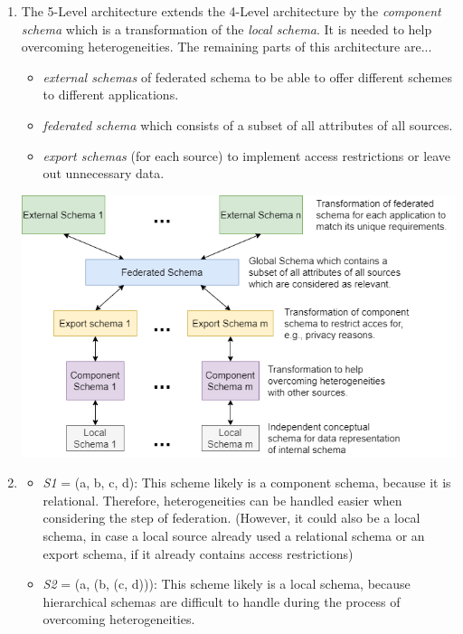 \documentclass{scrartcl}
\begin{document}
	\begin{enumerate}
		\item The 5-Level architecture extends the 4-Level architecture by the \textit{component schema} which is a transformation of the \textit{local schema}.
		It is needed to help overcoming heterogeneities.
		The remaining parts of this architecture are...
		\begin{itemize}
			\item \textit{external schemas} of federated schema to be able to offer different schemes to different applications.
			\item \textit{federated schema} which consists of a subset of all attributes of all sources.
			\item \textit{export schemas} (for each source) to implement access restrictions or leave out unnecessary data.
		\end{itemize}
		\begin{center}
			\hspace*{-1.5cm}
			\includegraphics[width=1.1\textwidth]{figures/Task3_a_Visualization.png}
		\end{center}
	
		\item\phantom{phantom}
		\begin{itemize}
			\item \textit{S1} = (a, b, c, d): This scheme likely is a component schema, because it is relational.
			Therefore, heterogeneities can be handled easier when considering the step of federation.
			(However, it could also be a local schema, in case a local source already used a relational schema or an export schema, if it already contains access restrictions)
			
			\item \textit{S2} = (a, (b, (c, d))): This scheme likely is a local schema, because hierarchical schemas are difficult to handle during the process of overcoming heterogeneities.
		\end{itemize}
	

\end{enumerate}
\end{document}
